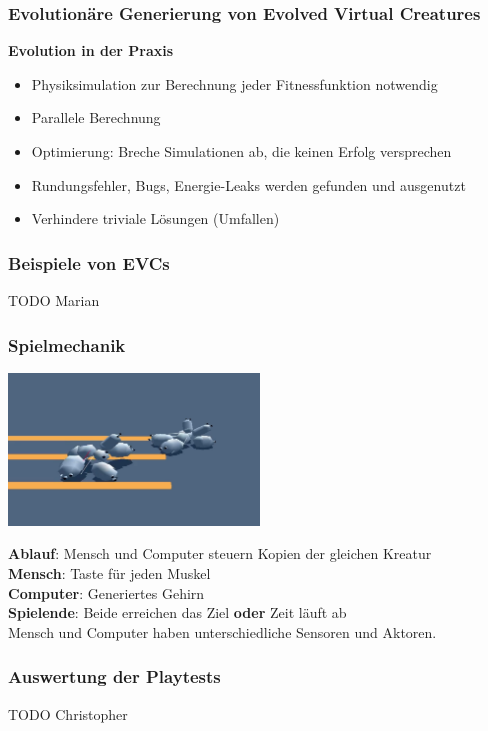 \documentclass{beamer}
\begin{document}
\begin{frame}
	\frametitle{Evolutionäre Generierung von Evolved Virtual Creatures}
	
	\textbf{Evolution in der Praxis}
	\begin{itemize}
		\item Physiksimulation zur Berechnung jeder Fitnessfunktion notwendig
		\item Parallele Berechnung
		\item Optimierung: Breche Simulationen ab, die keinen Erfolg versprechen
		\item Rundungsfehler, Bugs, Energie-Leaks werden gefunden und ausgenutzt
		\item Verhindere triviale Lösungen (Umfallen)
	\end{itemize}
\end{frame}

\begin{frame}
	\frametitle{Beispiele von EVCs}
	
	TODO Marian
\end{frame}


\begin{frame}
	\frametitle{Spielmechanik}
	
	\includegraphics[width=0.5\textwidth]{img/games/darwin.png}
	\vspace{1em}
	
	\textbf{Ablauf}: Mensch und Computer steuern Kopien der gleichen Kreatur \\
	\vspace{1em}
	\textbf{Mensch}: Taste für jeden Muskel \\
	\textbf{Computer}: Generiertes Gehirn \\
	\vspace{1em}
	\textbf{Spielende}: Beide erreichen das Ziel \textbf{oder} Zeit läuft ab \\
	\vspace{1em}
	Mensch und Computer haben unterschiedliche Sensoren und Aktoren.
\end{frame}

\begin{frame}
	\frametitle{Auswertung der Playtests}
	
	TODO Christopher
\end{frame}
\end{document}
